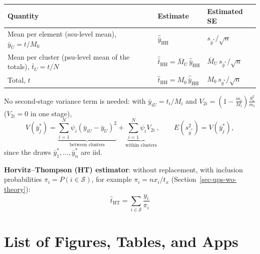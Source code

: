 \documentclass[
  letterpaper,
  DIV=11,
  numbers=noendperiod]{scrreprt}
\newcounter{none} %
\renewcommand{\[}{\begin{equation}}
\renewcommand{\]}{\end{equation}}
\begin{document}
{\def\LTcaptype{none} %
\begin{longtable}[]{@{}
  >{\raggedright\arraybackslash}p{}
  >{\raggedright\arraybackslash}p{}
  >{\raggedright\arraybackslash}p{}@{}}
\toprule\noalign{}
\begin{minipage}[b]{\linewidth}\raggedright
Quantity
\end{minipage} & \begin{minipage}[b]{\linewidth}\raggedright
Estimate
\end{minipage} & \begin{minipage}[b]{\linewidth}\raggedright
Estimated SE
\end{minipage} \\
\midrule\noalign{}
\endhead
\bottomrule\noalign{}
\endlastfoot
Mean per element (ssu-level mean), \(\bar y_U = t/M_0\) &
\(\hat{\bar y}_{\mathrm{HH}}\) & \(s_{\bar y^*}/\sqrt n\) \\
Mean per cluster (psu-level mean of the totals), \(\bar t_U = t/N\) &
\(\hat{\bar t}_{\mathrm{HH}} = \bar M_U\,\hat{\bar y}_{\mathrm{HH}}\) &
\(\bar M_U\,s_{\bar y^*}/\sqrt n\) \\
Total, \(t\) &
\(\hat t_{\mathrm{HH}} = M_0\,\hat{\bar y}_{\mathrm{HH}}\) &
\(M_0\,s_{\bar y^*}/\sqrt n\) \\
\end{longtable}
}

No second-stage variance term is needed: with \(\bar y_{iU} = t_i/M_i\)
and \(V_{2i} = \left(1-\frac{m_i}{M_i}\right)\frac{S_i^2}{m_i}\)
(\(V_{2i}=0\) in one stage), \[
V(\bar y_j^*) = \underbrace{\sum_{i=1}^N\psi_i\left(\bar y_{iU}-\bar y_U\right)^2}_{\text{between clusters}} + \underbrace{\sum_{i=1}^N\psi_i V_{2i}}_{\text{within clusters}},
\qquad E\left(s_{\bar y^*}^2\right) = V(\bar y_j^*),
\] since the draws \(\bar y_1^*,\dots,\bar y_n^*\) are iid.

\textbf{Horvitz--Thompson (HT) estimator}: without replacement, with
inclusion probabilities \(\pi_i = P(i\in\mathcal S)\), for example
\(\pi_i = n x_i/t_x\) (Section~\ref{sec-ups-wo-theory}): \[
\boxed{\hat{t}_{\mathrm{HT}}=\sum_{i\in\mathcal{S}}\frac{y_i}{\pi_i}}
\]

\chapter{List of Figures, Tables, and
Apps}\label{list-of-figures-tables-and-apps}
\end{document}
